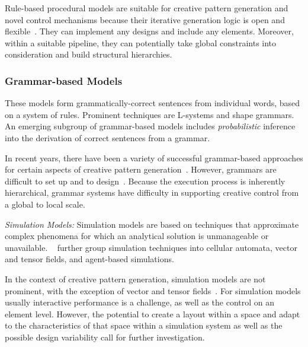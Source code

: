 Rule-based procedural models are suitable for creative pattern generation and novel control mechanisms because their iterative generation logic is open and flexible~\cite{wong_1998_cgf, mech_2012_tdf}. They can implement any designs and include any elements. Moreover, within a suitable pipeline, they can potentially take global constraints into consideration and build structural hierarchies.

\subsubsection{Grammar-based Models}

These models form grammatically-correct sentences from individual words, based on a system of rules. 
Prominent techniques are L-systems and shape grammars. An emerging subgroup of grammar-based models includes \textit{probabilistic} inference into the derivation of correct sentences from a grammar.

In recent years, there have been a variety of successful grammar-based approaches for certain aspects of creative pattern generation~\cite{benes_2011_gpm,talton_2011_mpm,ritchie_2015_cpm}. However, grammars are difficult to set up and to design~\cite{stava_2010_ipm}. Because the execution process is inherently hierarchical, grammar systems have difficulty in supporting creative control from a global to local scale.

\textit{Simulation Models:} Simulation models are based on techniques that approximate complex phenomena for which an analytical solution is unmanageable or unavailable. \citeauthor*{hendrikx_2013_pcg}~\cite{hendrikx_2013_pcg} further group simulation techniques into cellular automata, vector and tensor fields, and agent-based simulations. 

In the context of creative pattern generation, simulation models are not prominent, with the exception of vector and tensor fields~\cite{ijiri_2008_aeb,yuanyuan_2011_gso,saputra_2017_ffo}. For simulation models usually interactive performance is a challenge, as well as the control on an element level. However, the potential to create a layout within a space and adapt to the characteristics of that space within a simulation system as well as the possible design variability call for further investigation.


